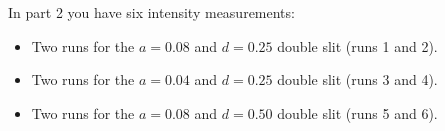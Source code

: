 In part 2 you have six intensity measurements:
\begin{itemize}
	\item Two runs for the $a = 0.08$ and $d = 0.25$ double slit (runs 1 and 2).
	\item Two runs for the $a = 0.04$ and $d = 0.25$ double slit (runs 3 and 4).
	\item Two runs for the $a = 0.08$ and $d = 0.50$ double slit (runs 5 and 6).
\end{itemize}
%
%
\newpage
